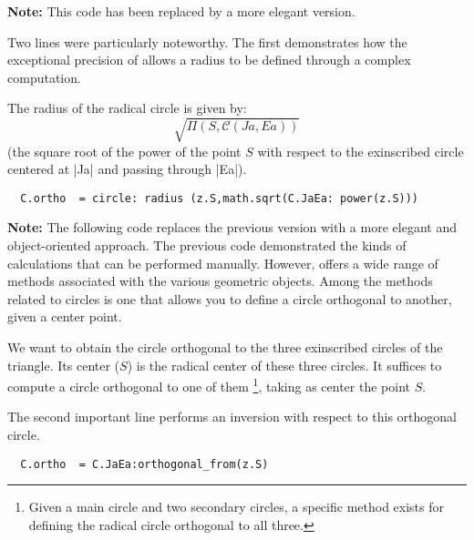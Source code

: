 \begin{tcolorbox}[
  title=Deprecated Code,
  colframe=red!50,
  colback=red!5,
  coltitle=black,
  sharp corners,
  fonttitle=\bfseries,
  leftrule=1mm,
  rightrule=1mm,
  toprule=0.5mm,
  bottomrule=0.5mm
]
\textbf{Note:} This code has been replaced by a more elegant version.

Two lines were particularly noteworthy. The first demonstrates how the exceptional precision of  allows a radius to be defined through a complex computation.

The radius of the radical circle is given by:
\[
\sqrt{\Pi(S,\mathcal{C}(Ja,Ea))}
\]
(the square root of the power of the point $S$ with respect to the exinscribed circle centered at |Ja| and passing through |Ea|).

\begin{mybox}{}
\begin{verbatim}
  C.ortho  = circle: radius (z.S,math.sqrt(C.JaEa: power(z.S)))
\end{verbatim}
\end{mybox}
\end{tcolorbox}

\begin{tcolorbox}[
  title=Revised Code,
  colframe=cyan!60!black,
  colback=cyan!5,
  coltitle=white,
  sharp corners,
  fonttitle=\bfseries,
  leftrule=1mm,
  rightrule=1mm,
  toprule=0.5mm,
  bottomrule=0.5mm
]
\textbf{Note:} The following code replaces the previous version with a more elegant and object-oriented approach.
The previous code demonstrated the kinds of calculations that can be performed manually. However,  offers a wide range of methods associated with the various geometric objects. Among the methods related to circles is one that allows you to define a circle orthogonal to another, given a center point.

We want to obtain the circle orthogonal to the three exinscribed circles of the triangle. Its center ($S$) is the radical center of these three circles. It suffices to compute a circle orthogonal to one of them \footnote{Given a main circle and two secondary circles, a specific method exists for defining the radical circle orthogonal to all three.}, taking as center the point $S$.  

The second important line performs an inversion with respect to this orthogonal circle.

\begin{mybox}{}
\begin{verbatim}
  C.ortho  = C.JaEa:orthogonal_from(z.S)
\end{verbatim}
\end{mybox}
\end{tcolorbox}

